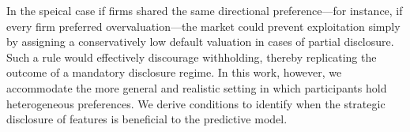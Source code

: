 In the speical case if firms shared the same directional preference---for instance, if every firm preferred overvaluation---the market could prevent exploitation simply by assigning a conservatively low default valuation in cases of partial disclosure. Such a rule would effectively discourage withholding, thereby replicating the outcome of a mandatory disclosure regime. In this work, however, we accommodate the more general and realistic setting in which participants hold heterogeneous preferences. We derive conditions to identify when the strategic disclosure of features is beneficial to the predictive model.






